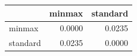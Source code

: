 \begin{tabular}{lrr}
\toprule
 & minmax & standard \\
\midrule
minmax & 0.0000 & 0.0235 \\
standard & 0.0235 & 0.0000 \\
\bottomrule
\end{tabular}
